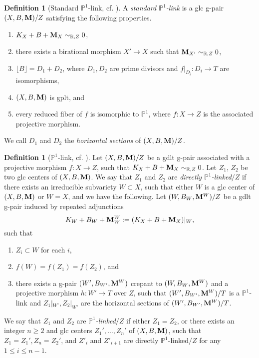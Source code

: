 \documentclass[11pt]{amsart}
\numberwithin{equation}{section}
\newcommand{\Mm}{{\bf{M}}}
\theoremstyle{definition}
\newtheorem{defn}[thm]{Definition}
\theoremstyle{definition}
\theoremstyle{definition}
\begin{document}
\begin{defn}[Standard $\mathbb P^1$-link, cf. {\cite[Definition 2.21]{FS20}}]\label{defn: standard p1 link}
A \emph{standard $\mathbb P^1$-link} is a glc g-pair $(X,B,\Mm)/Z$ satisfying the following properties.
\begin{enumerate}
\item $K_X+B+\Mm_X\sim_{\mathbb R,Z}0$,
\item there exists a birational morphism $X'\rightarrow X$ such that $\Mm_{X'}\sim_{\mathbb R,Z}0$,
\item $\lfloor B\rfloor=D_1+D_2$, where $D_1,D_2$ are prime divisors and $f|_{D_i}: D_i\rightarrow T$ are isomorphisms,
\item $(X,B,\Mm)$ is gplt, and
\item every reduced fiber of $f$ is isomorphic to $\mathbb P^1$, where $f: X\rightarrow Z$ is the associated projective morphism.
\end{enumerate}
We call $D_1$ and $D_2$ the \emph{horizontal sections} of $(X,B,\Mm)/Z$.
\end{defn}





\begin{defn}[$\mathbb P^1$-link, cf. {\cite[Definition 2.23]{FS20}}]\label{defn: p1 link}
Let $(X,B,\Mm)/Z$ be a gdlt g-pair associated with a projective morphism $f: X\rightarrow Z$, such that $K_X+B+\Mm_X\sim_{\mathbb R,Z}0$. Let $Z_1$, $Z_2$ be two glc centers of $(X,B,\Mm)$. We say that $Z_1$ and $Z_2$ are \emph{directly $\mathbb P^1$-linked$/Z$} if there exists an irreducible subvariety $W\subset X$, such that either $W$ is a glc center of $(X,B,\Mm)$ or $W=X$, and we have the following. Let $(W,B_W,\Mm^W)/Z$ be a gdlt g-pair induced by repeated adjunctions
$$K_W+B_W+\Mm^W_W:=(K_X+B+\Mm_X)|_W,$$
such that
\begin{enumerate}
    \item $Z_i\subset W$ for each $i$,
    \item $f(W)=f(Z_1)=f(Z_2)$, and
    \item there exists a g-pair $(W',B_{W'},\Mm^W)$ crepant to $(W,B_W,\Mm^W)$ and a projective morphism $h: W'\rightarrow T$ over $Z$, such that $(W',B_{W'},\Mm^W)/T$ is a $\mathbb P^1$-link and $Z_1|_{W'},Z_2|_{W'}$ are the horizontal sections of $(W',B_{W'},\Mm^W)/T$.
\end{enumerate}
We say that $Z_1$ and $Z_2$ are \emph{$\mathbb P^1$-linked$/Z$} if either $Z_1=Z_2$, or there exists an integer $n\geq 2$ and glc centers $Z_1',\dots,Z_n'$ of $(X,B,\Mm)$, such that $Z_1=Z_1',Z_n=Z_2'$, and $Z'_i$ and $Z'_{i+1}$ are directly $\mathbb P^1$-linked$/Z$ for any $1\leq i\leq n-1$.
\end{defn}
\end{document}
